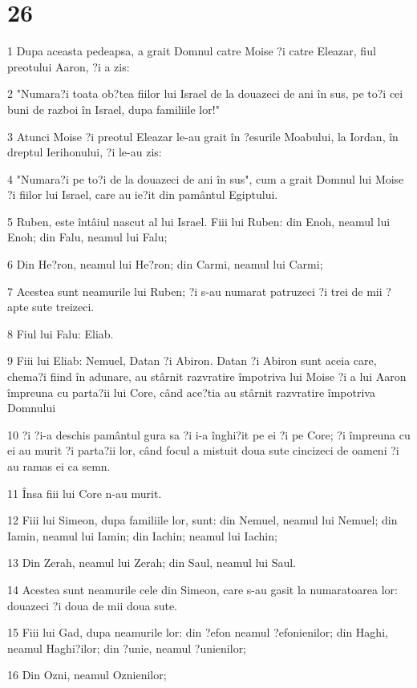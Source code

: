 \chapter{26}

\par 1 Dupa aceasta pedeapsa, a grait Domnul catre Moise ?i catre Eleazar, fiul preotului Aaron, ?i a zis:
\par 2 "Numara?i toata ob?tea fiilor lui Israel de la douazeci de ani în sus, pe to?i cei buni de razboi în Israel, dupa familiile lor!"
\par 3 Atunci Moise ?i preotul Eleazar le-au grait în ?esurile Moabului, la Iordan, în dreptul Ierihonului, ?i le-au zis:
\par 4 "Numara?i pe to?i de la douazeci de ani în sus", cum a grait Domnul lui Moise ?i fiilor lui Israel, care au ie?it din pamântul Egiptului.
\par 5 Ruben, este întâiul nascut al lui Israel. Fiii lui Ruben: din Enoh, neamul lui Enoh; din Falu, neamul lui Falu;
\par 6 Din He?ron, neamul lui He?ron; din Carmi, neamul lui Carmi;
\par 7 Acestea sunt neamurile lui Ruben; ?i s-au numarat patruzeci ?i trei de mii ?apte sute treizeci.
\par 8 Fiul lui Falu: Eliab.
\par 9 Fiii lui Eliab: Nemuel, Datan ?i Abiron. Datan ?i Abiron sunt aceia care, chema?i fiind în adunare, au stârnit razvratire împotriva lui Moise ?i a lui Aaron împreuna cu parta?ii lui Core, când ace?tia au stârnit razvratire împotriva Domnului
\par 10 ?i ?i-a deschis pamântul gura sa ?i i-a înghi?it pe ei ?i pe Core; ?i împreuna cu ei au murit ?i parta?ii lor, când focul a mistuit doua sute cincizeci de oameni ?i au ramas ei ca semn.
\par 11 Însa fiii lui Core n-au murit.
\par 12 Fiii lui Simeon, dupa familiile lor, sunt: din Nemuel, neamul lui Nemuel; din Iamin, neamul lui Iamin; din Iachin; neamul lui Iachin;
\par 13 Din Zerah, neamul lui Zerah; din Saul, neamul lui Saul.
\par 14 Acestea sunt neamurile cele din Simeon, care s-au gasit la numaratoarea lor: douazeci ?i doua de mii doua sute.
\par 15 Fiii lui Gad, dupa neamurile lor: din ?efon neamul ?efonienilor; din Haghi, neamul Haghi?ilor; din ?unie, neamul ?unienilor;
\par 16 Din Ozni, neamul Oznienilor;
